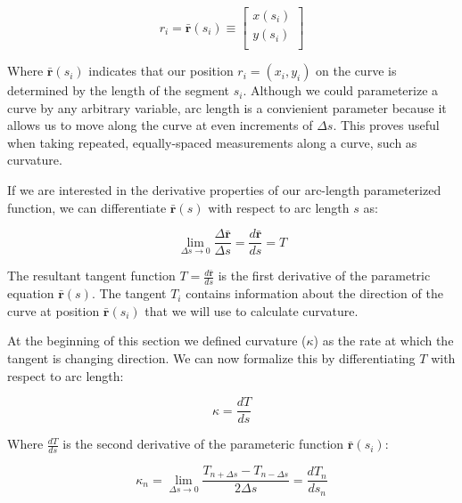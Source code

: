 \documentclass[]{article}
\begin{document}
\begin{equation}
\tag{1}

r_i =
\mathbf{\bar{r}}(s_i) \equiv \left[\begin{array}
{rrr}
x(s_i) \\
y(s_i) \\
\end{array}\right]

\end{equation}

Where \(\mathbf{\bar{r}}(s_i)\) indicates that our position
\(r_i = (x_i, y_i)\) on the curve is determined by the length of the
segment \(s_i\). Although we could parameterize a curve by any arbitrary
variable, arc length is a convienient parameter because it allows us to
move along the curve at even increments of \(\Delta s\). This proves
useful when taking repeated, equally-spaced measurements along a curve,
such as curvature.

If we are interested in the derivative properties of our arc-length
parameterized function, we can differentiate \(\mathbf{\bar{r}}(s)\)
with respect to arc length \(s\) as:

\begin{equation}
\tag{2}

\lim\limits_{\Delta s \to 0} \frac{\Delta \mathbf{\bar{r}}}{\Delta s} = \frac{d \mathbf{\bar{r}}}{ds} = T  

\end{equation}

The resultant tangent function \(T = \frac{d \mathbf{\bar{r}}}{ds}\) is
the first derivative of the parametric equation \(\mathbf{\bar{r}}(s)\).
The tangent \(T_i\) contains information about the direction of the
curve at position \(\mathbf{\bar{r}}(s_i)\) that we will use to
calculate curvature.

At the beginning of this section we defined curvature (\(\kappa\)) as
the rate at which the tangent is changing direction. We can now
formalize this by differentiating \(T\) with respect to arc length:

\begin{equation}
\tag{3}

\kappa = \frac{dT}{ds}

\end{equation}

Where \(\frac{dT}{ds}\) is the second derivative of the parameteric
function \(\mathbf{\bar{r}}(s_i)\):

\begin{equation}
\tag{4}

\kappa_n = \lim\limits_{\Delta s \to 0} \frac{T_{n+ \Delta s} - T_{n- \Delta s}}{2 \Delta s} = \frac{dT_n}{ds_n}

\end{equation}
\end{document}
